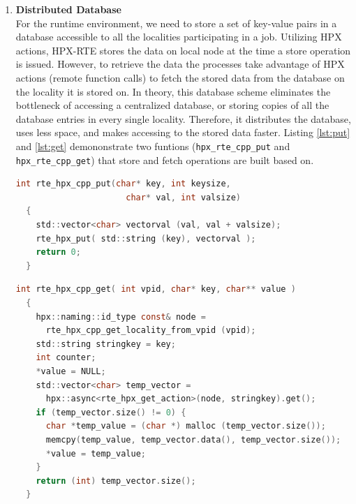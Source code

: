 \begin{enumerate}
\item \textbf{Distributed Database}\\
  For the runtime environment, we need to store a set of key-value pairs in a database accessible to all the localities participating in a job. Utilizing HPX actions, HPX-RTE stores the data on local node at the time a store operation is issued. However, to retrieve the data the processes take advantage of HPX actions (remote function calls) to fetch the stored data from the database on the locality it is stored on. In theory, this database scheme eliminates the bottleneck of accessing a centralized database, or storing copies of all the database entries in every single locality. Therefore, it distributes the database, uses less space, and makes accessing to the stored data faster. Listing \ref{lst:put} and \ref{lst:get} demononstrate two funtions (\verb|hpx_rte_cpp_put| and \verb|hpx_rte_cpp_get|) that store and fetch operations are built based on.

  \begin{lstlisting}[language=C, frame=single, basicstyle=\footnotesize, caption=Put Functionality\label{lst:put}]
  int rte_hpx_cpp_put(char* key, int keysize,
                      char* val, int valsize)
  {
    std::vector<char> vectorval (val, val + valsize);
    rte_hpx_put( std::string (key), vectorval );
    return 0;
  }
  \end{lstlisting}

  \begin{lstlisting}[language=C, frame=single, basicstyle=\footnotesize, caption=Get Functionality using HPX Asynchronous Actions\label{lst:get}]
  int rte_hpx_cpp_get( int vpid, char* key, char** value )
  {
    hpx::naming::id_type const& node =
      rte_hpx_cpp_get_locality_from_vpid (vpid);
    std::string stringkey = key;
    int counter;
    *value = NULL;
    std::vector<char> temp_vector =
      hpx::async<rte_hpx_get_action>(node, stringkey).get();
    if (temp_vector.size() != 0) {
      char *temp_value = (char *) malloc (temp_vector.size());
      memcpy(temp_value, temp_vector.data(), temp_vector.size());
      *value = temp_value;
    }
    return (int) temp_vector.size();
  }
  \end{lstlisting}


\end{enumerate}
